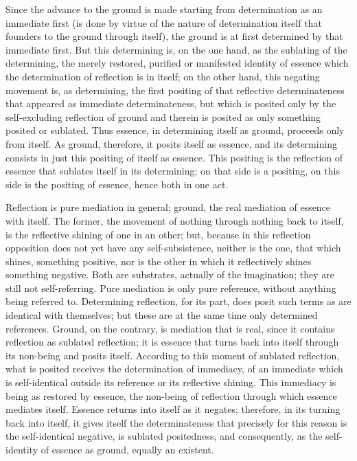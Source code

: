 Since the advance to the ground is made starting
from determination as an immediate first
(is done by virtue of the nature of determination itself
that founders to the ground through itself),
the ground is at first determined by that immediate first.
But this determining is, on the one hand,
as the sublating of the determining,
the merely restored, purified or manifested identity of essence
which the determination of reflection is in itself;
on the other hand, this negating movement is, as determining,
the first positing of that reflective determinateness
that appeared as immediate determinateness,
but which is posited only by the self-excluding reflection of ground
and therein is posited as only something posited or sublated.
Thus essence, in determining itself as ground, proceeds only from itself.
As ground, therefore, it posits itself as essence,
and its determining consists in just this positing of itself as essence.
This positing is the reflection of essence
that sublates itself in its determining;
on that side is a positing, on this side is the positing of essence,
hence both in one act.

Reflection is pure mediation in general;
ground, the real mediation of essence with itself.
The former, the movement of nothing through nothing back to itself,
is the reflective shining of one in an other;
but, because in this reflection opposition does not
yet have any self-subsistence,
neither is the one, that which shines, something positive,
nor is the other in which it reflectively shines something negative.
Both are substrates, actually of the imagination;
they are still not self-referring.
Pure mediation is only pure reference,
without anything being referred to.
Determining reflection, for its part, does posit
such terms as are identical with themselves;
but these are at the same time only determined references.
Ground, on the contrary, is mediation that is real,
since it contains reflection as sublated reflection;
it is essence that turns back into itself
through its non-being and posits itself.
According to this moment of sublated reflection,
what is posited receives the determination of immediacy,
of an immediate which is self-identical
outside its reference or its reflective shining.
This immediacy is being as restored by essence,
the non-being of reflection through which essence mediates itself.
Essence returns into itself as it negates;
therefore, in its turning back into itself,
it gives itself the determinateness that precisely
for this reason is the self-identical negative,
is sublated positedness, and consequently,
as the self-identity of essence as ground,
equally an existent.


